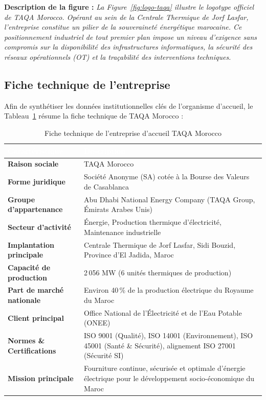 \documentclass[12pt, a4paper, oneside]{report}
\begin{document}
\noindent\small\textbf{Description de la figure :} \textit{La Figure~\ref{fig:logo-taqa} illustre le logotype officiel de TAQA Morocco. Opérant au sein de la Centrale Thermique de Jorf Lasfar, l'entreprise constitue un pilier de la souveraineté énergétique marocaine. Ce positionnement industriel de tout premier plan impose un niveau d'exigence sans compromis sur la disponibilité des infrastructures informatiques, la sécurité des réseaux opérationnels (OT) et la traçabilité des interventions techniques.}

\subsection{Fiche technique de l'entreprise}

Afin de synthétiser les données institutionnelles clés de l'organisme d'accueil, le Tableau~\ref{tab:fiche-taqa} résume la fiche technique de TAQA Morocco :

\begin{table}[H]
\centering
\caption{Fiche technique de l'entreprise d'accueil TAQA Morocco}
\label{tab:fiche-taqa}
\begin{tabularx}{\textwidth}{|>{\bfseries}p{4.2cm}|X|}
\hline
\rowcolor{themeDark}
\textcolor{white}{Caractéristique} & \textcolor{white}{Description} \\
\hline
Raison sociale & TAQA Morocco \\
\hline
Forme juridique & Société Anonyme (SA) cotée à la Bourse des Valeurs de Casablanca \\
\hline
Groupe d'appartenance & Abu Dhabi National Energy Company (TAQA Group, Émirats Arabes Unis) \\
\hline
Secteur d'activité & Énergie, Production thermique d'électricité, Maintenance industrielle \\
\hline
Implantation principale & Centrale Thermique de Jorf Lasfar, Sidi Bouzid, Province d'El Jadida, Maroc \\
\hline
Capacité de production & 2\,056 MW (6 unités thermiques de production) \\
\hline
Part de marché nationale & Environ 40\,\% de la production électrique du Royaume du Maroc \\
\hline
Client principal & Office National de l'Électricité et de l'Eau Potable (ONEE) \\
\hline
Normes \& Certifications & ISO 9001 (Qualité), ISO 14001 (Environnement), ISO 45001 (Santé \& Sécurité), alignement ISO 27001 (Sécurité SI) \\
\hline
Mission principale & Fourniture continue, sécurisée et optimale d'énergie électrique pour le développement socio-économique du Maroc \\
\hline
\end{tabularx}
\end{table}
\end{document}
